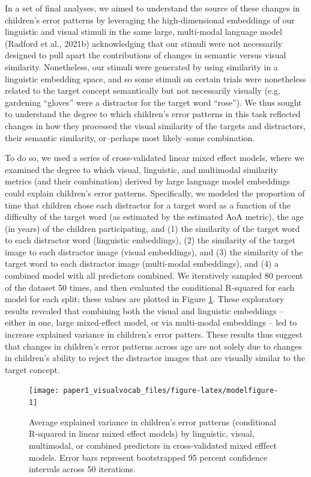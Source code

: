 \documentclass[
  man,mask]{apa6}
\begin{document}
In a set of final analyses, we aimed to understand the source of these changes in children's error patterns by leveraging the high-dimensional embeddings of our linguistic and visual stimuli in the same large, multi-modal language model (Radford et al., 2021b) acknowledging that our stimuli were not necessarily designed to pull apart the contributions of changes in semantic versus visual similarity. Nonetheless, our stimuli were generated by using similarity in a linguistic embedding space, and so some stimuli on certain trials were nonetheless related to the target concept semantically but not necessarily visually (e.g, gardening ``gloves'' were a distractor for the target word ``rose''). We thus sought to understand the degree to which children's error patterns in this task reflected changes in how they processed the visual similarity of the targets and distractors, their semantic similarity, or--perhaps most likely--some combination.

To do so, we used a series of cross-validated linear mixed effect models, where we examined the degree to which visual, linguistic, and multimodal similarity metrics (and their combination) derived by large language model embeddings could explain children's error patterns. Specifically, we modeled the proportion of time that children chose each distractor for a target word as a function of the difficulty of the target word (as estimated by the estimated AoA metric), the age (in years) of the children participating, and (1) the similarity of the target word to each distractor word (linguistic embeddings), (2) the similarity of the target image to each distractor image (visual embeddings), and (3) the similarity of the target word to each distractor image (multi-modal embeddings), and (4) a combined model with all predictors combined. We iteratively sampled 80 percent of the dataset 50 times, and then evaluated the conditional R-squared for each model for each split; these values are plotted in Figure \ref{fig:modelfigure}. These exploratory results revealed that combining both the visual and linguistic embeddings -- either in one, large mixed-effect model, or via multi-modal embeddings -- led to increase explained variance in children's error patters. These results thus suggest that changes in children's error patterns across age are not solely due to changes in children's ability to reject the distractor images that are visually similar to the target concept.

\begin{figure}[H]

{\centering \texttt{[image: paper1\_visualvocab\_files/figure-latex/modelfigure-1]} 

}

\caption{Average explained variance in children's error patterns (conditional R-squared in linear mixed effect models) by linguistic, visual, multimodal, or combined predictors in cross-validated mixed efffect models. Error bars represent bootstrapped 95 percent confidence intervals across 50 iterations.}\label{fig:modelfigure}
\end{figure}
\end{document}
